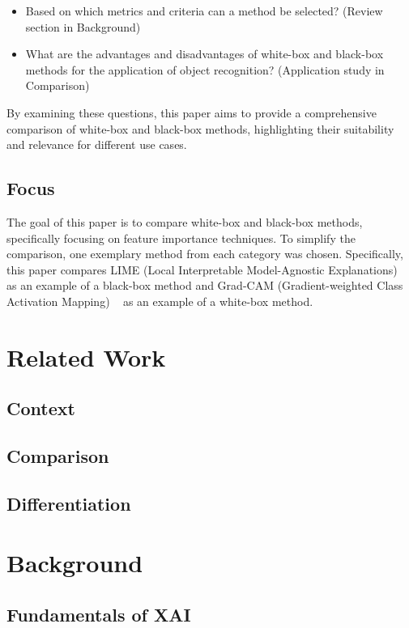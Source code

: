 \documentclass{article}
\begin{document}
\begin{itemize}
    \item Based on which metrics and criteria can a method be selected? (Review section in Background)
    \item What are the advantages and disadvantages of white-box and black-box methods for the application of object recognition? (Application study in Comparison)
\end{itemize}

By examining these questions, this paper aims to provide a comprehensive comparison of white-box and black-box methods, highlighting their suitability and relevance for different use cases.

\subsection{Focus}

The goal of this paper is to compare white-box and black-box methods, specifically focusing on feature importance techniques. To simplify the comparison, one exemplary method from each category was chosen. Specifically, this paper compares LIME (Local Interpretable Model-Agnostic Explanations) ~\cite{ribeiro2016why} as an example of a black-box method and Grad-CAM (Gradient-weighted Class Activation Mapping) ~\cite{Selvaraju_2019} as an example of a white-box method.



\section{Related Work}
\subsection{Context}
\subsection{Comparison}
\subsection{Differentiation}

\section{Background}

\subsection{Fundamentals of XAI}
\end{document}
